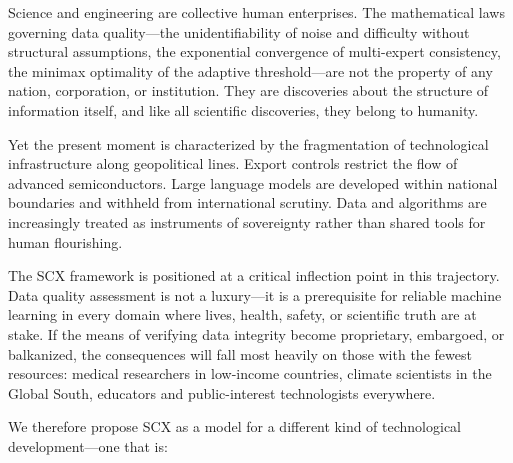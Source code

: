\documentclass[twocolumn]{article}
\theoremstyle{definition}
\begin{document}
Science and engineering are collective human enterprises. The mathematical laws governing data quality---the unidentifiability of noise and difficulty without structural assumptions, the exponential convergence of multi-expert consistency, the minimax optimality of the adaptive threshold---are not the property of any nation, corporation, or institution. They are discoveries about the structure of information itself, and like all scientific discoveries, they belong to humanity.

Yet the present moment is characterized by the fragmentation of technological infrastructure along geopolitical lines. Export controls restrict the flow of advanced semiconductors. Large language models are developed within national boundaries and withheld from international scrutiny. Data and algorithms are increasingly treated as instruments of sovereignty rather than shared tools for human flourishing.

The SCX framework is positioned at a critical inflection point in this trajectory. Data quality assessment is not a luxury---it is a prerequisite for reliable machine learning in every domain where lives, health, safety, or scientific truth are at stake. If the means of verifying data integrity become proprietary, embargoed, or balkanized, the consequences will fall most heavily on those with the fewest resources: medical researchers in low-income countries, climate scientists in the Global South, educators and public-interest technologists everywhere.

We therefore propose SCX as a model for a different kind of technological development---one that is:
\end{document}
